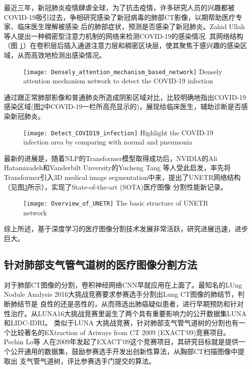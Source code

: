 	最近三年，新冠肺炎疫情肆虐全球，为了抗击疫情，许多研究人员的兴趣都被COVID-19吸引过去，争相研究感染了新冠病毒的肺部CT影像，以期帮助医疗专家、临床医生理解被感染
	后的肺部症状，预测是否感染了新冠肺炎。Zahid Ullah等人\cite{Ullah2023DenselyAM}提出一种稠密型注意力机制的网络来检测COVID-19的感染情况. 其网络结构（图
	\ref{fig:COVID19}）在卷积层后插入通道注意力层和稠密区块层，使其聚焦于感兴趣的感染区域，从而高效地检测出感染情况。
	\begin{figure}[!htp]
		\centering
		\texttt{[image: Densely\_attention\_mechanism\_based\_network]}
			{Densely attention mechanism network to detect the COVID-19 infection}
		\label{fig:COVID19}
	\end{figure}
	通过跟正常肺部影像和普通肺炎所造成阴影区域对比，比较明确地指出COVID-19感染区域(图\ref{fig:COVID19_detection}中COVID-19一栏所高亮显示的)，展现给临床医生，辅助诊断是否感染新冠肺炎。
	\begin{figure}[!htp]
		\centering
		\texttt{[image: Detect\_COVID19\_infection]}
			{Highlight the COVID-19 infection area by comparing with normal and pneumonia}
		\label{fig:COVID19_detection}
	\end{figure}
	
	最新的进展是，随着NLP的Transformer模型\cite{Devlin2019BERTPO, NIPS2017Attention}取得成功后，NVIDIA的Ali Hatamizadeh和Vanderbilt Unversity的Yucheng Tang
	等人\cite{unetr}受此启发，率先将Transformer引入3D medical image segmentation中来，提出了UNETR网络结构（见图\ref{fig:UNETR}所示），实现了State-of-the-art (SOTA)医疗图像
	分割性能新记录。
	\begin{figure}[!htp]
		\centering
		\texttt{[image: Overview\_of\_UNETR]}
			{The basic structure of UNETR network}
		\label{fig:UNETR}
	\end{figure}
	
	综上所述，基于深度学习的医疗图像分割技术发展非常活跃，研究进展迅速，进步巨大。
	
	
	
	\subsection{针对肺部支气管气道树的医疗图像分割方法}
	对于肺部CT图像的分割，卷积神经网络CNN早就应用在上面了。最知名的LUng Nodule Analysis 2016大挑战竞赛要求参赛选手分割出Lung CT图像的肺结节，判断肺结节是
	良性的还是恶性的，从而筛选出肺癌疑似患者，进行早期预防和针对性治疗。从LUNA16大挑战竞赛里诞生了两个具有重要影响力的公开数据集LUNA和LIDC-IDRI。 类似于LUNA
	大挑战竞赛，针对肺部支气管气道树的分割也有一个比较著名的EXtraction of Ariways from CT 2009 (EXACT'09)竞赛项目。Pechin Lo等
	人\cite{Lo2012ExtractionOA}在2009年发起了EXACT'09这个竞赛项目，其研究目标就是提供一个公开通用的数据集，鼓励参赛选手开发出创新性算法，从胸部CT扫描图像中提取出
	支气管气道树，评比参赛选手门提交的算法。
	
